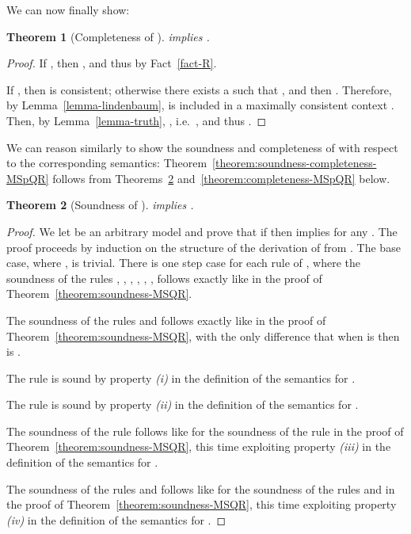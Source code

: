 \documentclass[times, 10pt]{article}
\newtheorem{theorem}{Theorem}
\begin{document}
\begin{figure*}[t]
We can now finally show:
\begin{theorem}[Completeness of ]\label{theorem:completeness-MSQR}
 implies .
\end{theorem}
\begin{proof}
  If , then , and thus 
   by Fact~\ref{fact-R}.  
  
  If , then  is consistent; otherwise
  there exists a  such that , and then 
  . Therefore, by Lemma~\ref{lemma-lindenbaum}, 
   is included in a maximally consistent
  context .  Then, by
  Lemma~\ref{lemma-truth}, , 
  i.e.~, and thus 
  .
\end{proof}

We can reason similarly to show the soundness and completeness of  with respect to the corresponding semantics: 
Theorem~\ref{theorem:soundness-completeness-MSpQR} follows from Theorems~\ref{theorem:soundness-MSpQR}
and~\ref{theorem:completeness-MSpQR} below.

\begin{theorem}[Soundness of ]\label{theorem:soundness-MSpQR}
 implies .
\end{theorem}

\begin{proof}
We let  be an arbitrary model and prove that if  then 
 implies   for any .
The proof proceeds by induction on the structure of the derivation of  from .  The base case, where , is trivial.  There is one step case for each 
rule of , where the soundness of the rules , , , , 
, ,  follows exactly like in the proof of Theorem~\ref{theorem:soundness-MSQR}.
 
The soundness of the rules  and  follows exactly like in the proof of 
Theorem~\ref{theorem:soundness-MSQR}, with the only difference that when  is 
 then  is .

The rule  is sound by property \emph{(i)} in the definition of the semantics for .

The rule  is sound by property \emph{(ii)} in the definition of the semantics for .

The soundness of the rule   follows like for the soundness
of the rule  in the proof of 
Theorem~\ref{theorem:soundness-MSQR}, this time exploiting property  \emph{(iii)} in the 
definition of the semantics for .

The soundness of the rules  and  follows like for the soundness
of the rules  and  in the proof of 
Theorem~\ref{theorem:soundness-MSQR}, this time exploiting property  \emph{(iv)} in the 
definition of the semantics for .
\end{proof}


\end{figure*}
\end{document}
